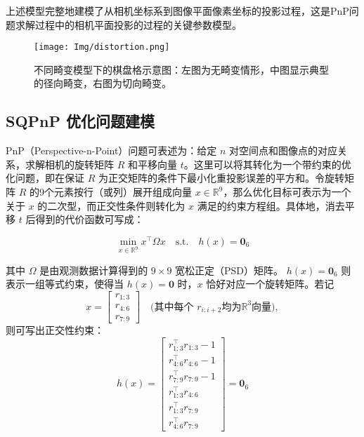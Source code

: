 上述模型完整地建模了从相机坐标系到图像平面像素坐标的投影过程，这是PnP问题求解过程中的相机平面投影的过程的关键参数模型。

\begin{figure}[htbp]
	\centering
	\texttt{[image: Img/distortion.png]}
	\caption{不同畸变模型下的棋盘格示意图：左图为无畸变情形，中图显示典型的径向畸变，右图为切向畸变。}
	\label{fig:distortion_patterns}
\end{figure}

\subsection{SQPnP 优化问题建模}
PnP（Perspective-n-Point）问题可表述为：给定 $n$ 对空间点和图像点的对应关系，求解相机的旋转矩阵 $R$ 和平移向量 $t$。这里可以将其转化为一个带约束的优化问题，即在保证 $R$ 为正交矩阵的条件下最小化重投影误差的平方和。令旋转矩阵 $R$ 的9个元素按行（或列）展开组成向量 $x \in \mathbb{R}^9$，那么优化目标可表示为一个关于 $x$ 的二次型，而正交性条件则转化为 $x$ 满足的约束方程组。具体地，消去平移 $t$ 后得到的代价函数可写成：

\begin{equation}
	\min_{x \in \mathbb{R}^9}   x^\top \Omega x
	\quad \text{s.t.} \quad
	h(x) = \mathbf{0}_6
\end{equation}

其中 $\Omega$ 是由观测数据计算得到的 $9 \times 9$ 宽松正定（PSD）矩阵。  
$h(x) = \mathbf{0}_6$ 则表示一组等式约束，使得当 $h(x)=\mathbf{0}$ 时，$x$ 恰好对应一个旋转矩阵。若记
\begin{equation}
	x = 
	\begin{bmatrix}
		r_{1:3} \\[2pt]
		r_{4:6} \\[2pt]
		r_{7:9}
	\end{bmatrix}
	\quad\text{(其中每个 }r_{i:i+2}\text{均为}\mathbb{R}^3\text{向量)},
\end{equation}
则可写出正交性约束：
\begin{equation}
	h(x)  = 
	\begin{bmatrix}
		r_{1:3}^\top r_{1:3}  -  1 \\
		r_{4:6}^\top r_{4:6}  -  1 \\
		r_{7:9}^\top r_{7:9}  -  1 \\
		r_{1:3}^\top r_{4:6} \\
		r_{1:3}^\top r_{7:9} \\
		r_{4:6}^\top r_{7:9}
	\end{bmatrix}
	= 
	\mathbf{0}_6 
\end{equation}
